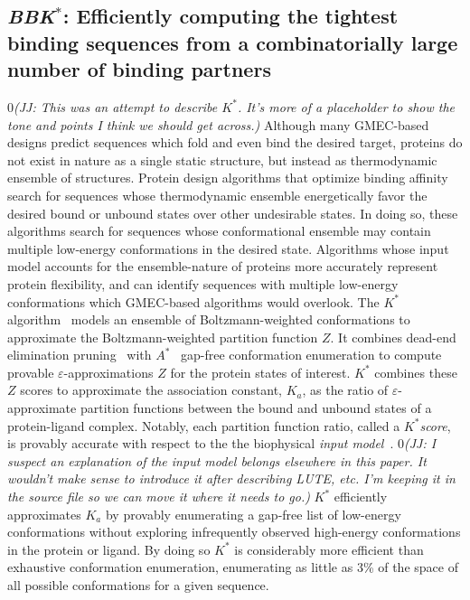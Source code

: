 \def\as{\textit{$A^*$}\xspace}
\def\ks{\textit{$K^*$}\xspace}
\def\ka{\textit{$K_a$}\xspace}
\def\bbks{\textit{BBK$^*$}\xspace}
\def\multisequencebound{MS\xspace}
\def\msbound{\multisequencebound}


\def\submissionMode{0}

\newcommand{\cut}[1]{}
\newcommand{\jj}[1]{\if\submissionMode0{\em\color{blue}(JJ: #1)}\else\fi}

\subsection{\bbks: Efficiently computing the tightest binding sequences from a combinatorially large number of binding partners}
\jj{This was an attempt to describe \ks. It's more of a placeholder to show the tone and points I think we should get across.}
Although many GMEC-based designs predict sequences which fold and even bind the desired target, proteins do not exist in nature as a single static structure, but instead as thermodynamic ensemble of structures. Protein design algorithms that optimize binding affinity search for sequences whose thermodynamic ensemble energetically favor the desired bound or unbound states over other undesirable states. In doing so, these algorithms search for sequences whose conformational ensemble may contain multiple low-energy conformations in the desired state. Algorithms whose input model accounts for the ensemble-nature of proteins more accurately represent protein flexibility, and can identify sequences with multiple low-energy conformations which GMEC-based algorithms would overlook.
The \ks algorithm~\cite{} models an ensemble of Boltzmann-weighted conformations to approximate the Boltzmann-weighted partition function $Z$. It combines dead-end elimination pruning~\cite{} with \as~\cite{} gap-free conformation enumeration to compute provable $\varepsilon$-approximations $Z$ for the protein states of interest. \ks combines these $Z$ scores to approximate the association constant, \ka, as the ratio of $\varepsilon$-approximate partition functions between the bound and unbound states of a protein-ligand complex. Notably, each partition function ratio, called a \ks \emph{score}, is provably accurate with respect to the the biophysical \emph{input model}~\cite{}. \jj{I suspect an explanation of the input model belongs elsewhere in this paper. It wouldn't make sense to introduce it after describing LUTE, etc. I'm keeping it in the source file so we can move it where it needs to go.}\cut{The input model defines the set of allowed amino acid mutations (i.e.~the \emph{sequence space}), structural search space (i.e.~the input structures, and allowed protein flexibility), the optimization objective (e.g.~design for binding affinity), and the energy function~\cite{}.} \ks efficiently approximates \ka by provably enumerating a gap-free list of low-energy conformations without exploring infrequently observed high-energy conformations in the protein or ligand. By doing so \ks is considerably more efficient than exhaustive conformation enumeration, enumerating as little as 3\% of the space of all possible conformations for a given sequence.
